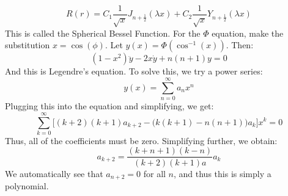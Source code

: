 \documentclass[crop=false,class=book,oneside]{standalone}
\begin{document}
            \begin{equation}
                R(r)=C_{1}\frac{1}{\sqrt{x}}J_{n+\frac{1}{2}}(
                    \lambda{x})+C_{2}\frac{1}{\sqrt{x}}
                    Y_{n+\frac{1}{2}}(\lambda{x})
            \end{equation}
            This is called the Spherical Bessel Function. For the
            $\Phi$ equation, make the substitution $x=\cos(\phi)$.
            Let $y(x)=\Phi(\cos^{\minus{1}}(x))$. Then:
            \begin{equation}
                (1-x^{2})\ddot{y}-2x\dot{y}+n(n+1)y=0
            \end{equation}
            And this is Legendre's equation. To solve this, we try
            a power series:
            \begin{equation}
                y(x)=\sum_{n=0}^{\infty}a_{n}x^{n}
            \end{equation}
            Plugging this into the equation and simplifying,
            we get:
            \begin{equation}
                \sum_{k=0}^{\infty}\Big[
                    (k+2)(k+1)a_{k+2}-\big(k(k+1)-n(n+1)\big)a_{k}
                    \Big]x^{k}=0
            \end{equation}
            Thus, all of the coefficients must be zero. Simplifying
            further, we obtain:
            \begin{equation}
                a_{k+2}=\frac{(k+n+1)(k-n)}{(k+2)(k+1)a}a_{k}
            \end{equation}
            We automatically see that $a_{n+2}=0$ for all $n$, and
            thus this is simply a polynomial.
\end{document}
